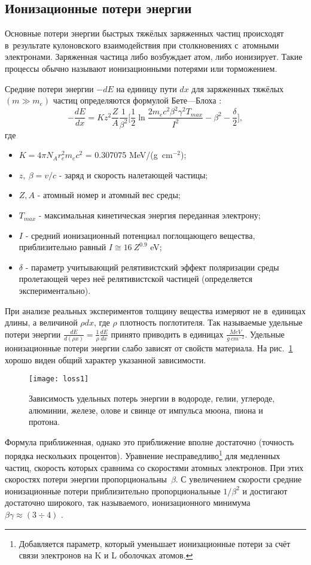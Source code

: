 \subsection{Ионизационные потери энергии}
Основные потери энергии быстрых тяжёлых заряженных частиц происходят
в~результате кулоновского взаимодействия при столкновениях с~атомными
электронами. Заряженная частица либо возбуждает атом, либо ионизирует.
Такие процессы обычно называют ионизационными потерями или
торможением.

Средние потери энергии $-dE$ на единицу пути $dx$ для заряженных тяжёлых
$(m\gg m_e)$ частиц определяются формулой Бете---Блоха \cite{pdg}:
\[
-\frac{dE}{dx}=Kz^2\frac{Z}{A}\frac{1}{\beta^2}
\Biggl[\frac{1}{2}\ln\frac{2m_ec^2\beta^2\gamma^2T_{max}}{I^2}-\beta^2-\frac{\delta}{2}\Biggr],
\]
где
\begin{itemize}
\item $K=4\pi N_Ar_e^2m_ec^2$ = 0.307075 MeV/(g~cm$^{-2}$);
\item $z,~\beta = v/c$ - заряд и скорость налетающей частицы;
\item $Z, A$ - атомный номер и атомный вес среды;
\item $T_{max}$ - максимальная кинетическая энергия переданная электрону;
\item $I$ - средний ионизационный потенциал поглощающего вещества,
  приблизительно равный $I\cong 16~Z^{0.9}$ eV;
\item $\delta$ - параметр учитывающий релятивистский эффект поляризации
  среды пролетающей через неё релятивистской частицей (определяется
  экспериментально).
\end{itemize}
При анализе реальных экспериментов толщину вещества измеряют не
в~единицах длины, а величиной $\rho dx$, где $\rho$ плотность поглотителя.
Так называемые удельные потери энергии
$\frac{dE}{d(\rho x)}=\frac{1}{\rho}\frac{dE}{dx}$ принято приводить
в единицах $\frac{MeV}{g~cm^{-2}}$. Удельные ионизационные потери энергии
слабо зависят от свойств материала. На рис.~\ref{fig:loss1} хорошо виден
общий характер указанной зависимости.
\begin{figure}[h]\center
  \texttt{[image: loss1]}
  \caption{Зависимость удельных потерь энергии в водороде, гелии,
    углероде, алюминии, железе, олове и свинце от импульса мюона,
    пиона и протона.}
  \label{fig:loss1}
\end{figure}

Формула приближенная, однако это приближение вполне достаточно (точность
порядка нескольких процентов). Уравнение несправедливо\footnote{
  Добавляется параметр, который уменьшает ионизационные потери за счёт
  связи электронов на K и L оболочках атомов.} для медленных частиц,
скорость которых сравнима со скоростями атомных электронов.
При этих скоростях потери энергии пропорциональны~$\beta$. С увеличением
скорости средние ионизационные потери приблизительно пропорциональные
$1/\beta^2$ и достигают достаточно широкого, так называемого,
ионизационного минимума $\beta\gamma\approx (3 \div 4)$ \cite{cer:04}.

